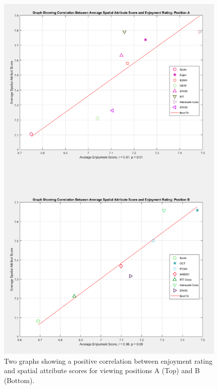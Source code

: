 	\begin{figure}
		\includegraphics[width=\linewidth]{images/stats/enjoyment_corr_V1.PNG}
		\caption{Two graphs showing a positive correlation between enjoyment rating and spatial attribute scores for viewing positions A (Top) and B (Bottom).}
		\label{image:enjoyment} 
	\end{figure}		
